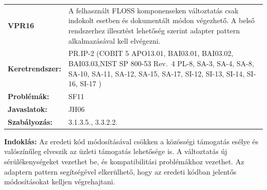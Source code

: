 \documentclass[12pt,magyar,a4paper,oneside]{scrreprt}
\begin{document}
\begin{longtable}[]{@{}ll@{}}
\toprule
\endhead
\begin{minipage}[t]{0.16\columnwidth}\raggedright
\textbf{VPR16}\strut
\end{minipage} & \begin{minipage}[t]{0.79\columnwidth}\raggedright
A felhasznált FLOSS komponenseken változtatás csak indokolt esetben és
dokumentált módon végezhető. A belső rendszerhez illesztést lehetőség
szerint adapter pattern alkalmazásával kell elvégezni.\strut
\end{minipage}\tabularnewline
\begin{minipage}[t]{0.16\columnwidth}\raggedright
\textbf{Keretrendszer:}\strut
\end{minipage} & \begin{minipage}[t]{0.79\columnwidth}\raggedright
PR.IP-2 (COBIT 5 APO13.01, BAI03.01, BAI03.02, BAI03.03,NIST SP 800-53
Rev.~4 PL-8, SA-3, SA-4, SA-8, SA-10, SA-11, SA-12, SA-15, SA-17, SI-12,
SI-13, SI-14, SI-16, SI-17 )\strut
\end{minipage}\tabularnewline
\begin{minipage}[t]{0.16\columnwidth}\raggedright
\textbf{Problémák:}\strut
\end{minipage} & \begin{minipage}[t]{0.79\columnwidth}\raggedright
SF11\strut
\end{minipage}\tabularnewline
\begin{minipage}[t]{0.16\columnwidth}\raggedright
\textbf{Javaslatok:}\strut
\end{minipage} & \begin{minipage}[t]{0.79\columnwidth}\raggedright
JH06\strut
\end{minipage}\tabularnewline
\begin{minipage}[t]{0.16\columnwidth}\raggedright
\textbf{Szabályozás:}\strut
\end{minipage} & \begin{minipage}[t]{0.79\columnwidth}\raggedright
3.1.3.5., 3.3.2.2.\strut
\end{minipage}\tabularnewline
\bottomrule
\end{longtable}

\textbf{Indoklás: } Az eredeti kód módosításával csökken a közösségi
támogatás esélye és valószínűleg elveszik az üzleti támogatás lehetősége
is. A változtatás új sérülékenységeket vezethet be, és kompatibilitási
problémákhoz vezethet. Az adaptern pattern segítségével elkerülhető,
hogy az eredeti kódban jelentős módosításokat kelljen végrehajtani.
\end{document}
